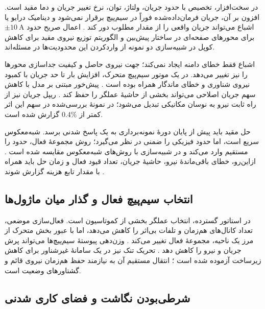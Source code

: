 در سخت‌افزار، تخصیص با حدود جریان، ولتاژ، توان، نرخ تغییر جریان و دما مقید است. افزون بر آن، جریان فرمان‌داده‌شده فوراً در سیم‌پیچ برقرار نمی‌شود و دینامیک درایو یا اشباع می‌تواند جریان واقعی را از مقدار مطلوب دور کند \cite{ranDriveaugmentedModelPredictive2025}. اعمال صریح حدود \(\pm10~\mathrm{A}\) برای محورهای صفحه‌ای در ساختار پیش‌بین \cite{xuPredictorbasedModelPredictive2023} و الگوریتم توزیع نیروی مقید برای کاهش کوپل در شبیه‌سازی \cite{wangNovelAlgorithmForce2025} دو نمونه از واردکردن این محدودیت‌ها در مسئله‌اند.

اشباع فقط خطای دامنه ایجاد نمی‌کند؛ جهت نیروی حاصل و کیفیت جداسازی محورها را نیز تغییر می‌دهد. در یک موتور سیم‌پیچ متحرک، افزایش بار تا حد جریان با کمبود نیروی شناوری و خطای ماندگار همراه بوده است \cite{nakataDriveStabilizationMultidegreeoffreedom2025}. پیش‌خور مبتنی بر مدل با کاهش سهم جریان اصلاحی می‌تواند بخشی از حاشیهٔ عملگر را حفظ کند \cite{nakataHighlyResponsiveDrive2025}. ریپل جریان نیز از راه ثابت نیرو به نوسان مکانیکی تبدیل می‌شود؛ در نمونهٔ بررسی‌شده در \cite{liuFluctuationAnalysisElectromagnetic2024} سهم این اثر کمتر از \(0.4\%\) گزارش شده است.

حل مقید باید پیش از پایان دورهٔ نمونه‌برداری به یک پاسخ شدنی برسد. شبه‌معکوس سریع است، اما حدود فیزیکی را ضمنی در نظر می‌گیرد؛ روش مجموعهٔ فعال، حدود را مستقیم وارد می‌کند و در شبیه‌سازی با روش‌های شبه‌معکوس مقایسه شده است \cite{liuOptimizedRealTimeCurrent2026}. ازاین‌رو، خطای باقی‌ماندهٔ نیرو، حاشیهٔ جریان، تعداد قیود فعال و زمان حل باید همراه با مقدار تابع هزینه گزارش شوند \cite{zhouTrackingErrorSuppression2025}.

\subsection{انتخاب سیم‌پیچ فعال و گذار میان ماژول‌ها}
\label{subsec:redundancy_active_coils}

در استاتور گسترده، انتخاب عملگر بخشی از کموتاسیون است. فعال‌سازی موضعی، تعداد کانال‌های هم‌زمان و تلفات بی‌اثر را کاهش می‌دهد، اما با عبور بخش متحرک از مرز یک ناحیه، مجموعهٔ فعال تغییر می‌کند \cite{xuModularMaglevDesign2024d,takahashiDevelopmentPlanarStage2025}. وزن‌دهی پیوستهٔ سیم‌پیچ‌ها می‌تواند پرش جریان و نیرو را کاهش دهد \cite{cmmCommutationMagneticallyLevitated2008}. تحریک تنک نیز در یک سامانهٔ غیرشناور برای کاهش زیرساخت آزموده شده است \cite{liNonLevitativeElectromagnetRobot2025}؛ انتقال مستقیم آن به  نیازمند حفظ هم‌زمان نیروی قائم و گشتاورهای وضعیت است.

\subsection{شرطی‌بودن نگاشت و فضای کاری شدنی}
\label{subsec:commutation_calibration}

